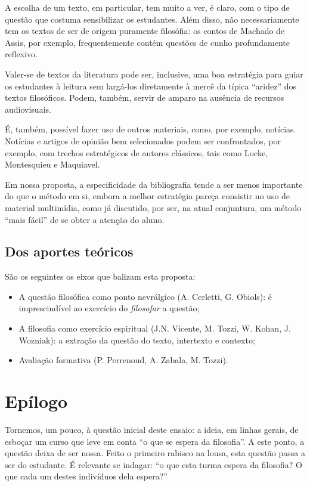 \documentclass[12pt,a4paper]{article}
\begin{document}
	A escolha de um texto, em particular, tem muito a ver, é claro, 
	com o tipo de questão que costuma sensibilizar os estudantes. 
	Além disso, não necessariamente tem os textos de ser de origem 
	puramente filosófia: os contos de Machado de Assis, por exemplo, 
	frequentemente contém questões de cunho profundamente reflexivo. 

	Valer-se de textos da literatura pode ser, inclusive, uma boa 
	estratégia para guiar os estudantes à leitura sem largá-los 
	diretamente à mercê da típica “aridez” dos textos filosóficos. 
	Podem, também, servir de amparo na ausência de recursos 
	audiovisuais. 

	É, também, possível fazer uso de outros materiais, como, por exemplo, 
	notícias. Notícias e artigos de opinião bem selecionados podem ser 
	confrontados, por exemplo, com trechos estratégicos de autores 
	clássicos, tais como Locke, Montesquieu e Maquiavel. 

	Em nossa proposta, a especificidade da bibliografia tende a ser 
	menos importante do que o método em si, embora a melhor estratégia 
	pareça consistir no uso de material multimídia, como já discutido, 
	por ser, na atual conjuntura, um método “mais fácil” de se obter 
	a atenção do aluno. 

	\subsection{Dos aportes teóricos}

	São os seguintes os eixos que balizam esta proposta: 
	
	\begin{itemize}
		\item A questão filosófica como ponto nevrálgico (A. Cerletti, 
		G. Obiols): é imprescindível ao exercício do \emph{filosofar} 
		a questão; 
		\item A filosofia como exercício espiritual (J.N. Vicente, 
		M. Tozzi, W. Kohan, J. Wozniak): a extração da questão do 
		texto, intertexto e contexto; 
		\item Avaliação formativa (P. Perrenoud, A. Zabala, M. Tozzi).  
	\end{itemize}

	\newpage

	\section{Epílogo}

	Tornemos, um pouco, à questão inicial deste ensaio: a ideia, em linhas 
	gerais, de esboçar um curso que leve em conta “o que se espera da 
	filosofia”. A este ponto, a questão deixa de ser nossa. Feito o 
	primeiro rabisco na lousa, esta questão passa a ser do estudante. 
	É relevante se indagar: “o que esta turma espera da filosofia? 
	O que cada um destes indivíduos dela espera?”
\end{document}
